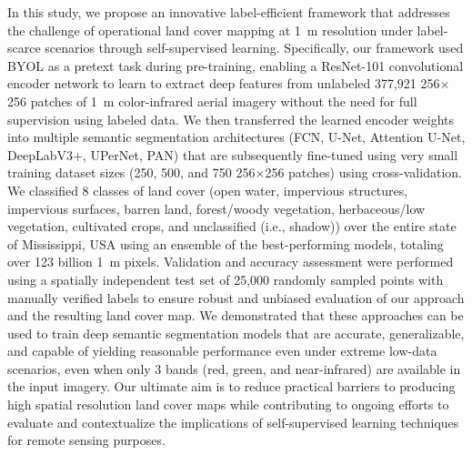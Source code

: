 In this study, we propose an innovative label-efficient framework that addresses the challenge of operational land cover mapping at \SI{1}{\meter} resolution under label-scarce scenarios through self-supervised learning.
Specifically, our framework used BYOL as a pretext task during pre-training, enabling a ResNet-101 convolutional encoder network to learn to extract deep features from unlabeled 377,921 256\(\times\)256 patches of \SI{1}{\meter} color-infrared aerial imagery without the need for full supervision using labeled data.
We then transferred the learned encoder weights into multiple semantic segmentation architectures (FCN, U-Net, Attention U-Net, DeepLabV3+, UPerNet, PAN) that are subsequently fine-tuned using very small training dataset sizes (250, 500, and 750 256\(\times\)256 patches) using cross-validation.
We classified 8 classes of land cover (open water, impervious structures, impervious surfaces, barren land, forest/woody vegetation, herbaceous/low vegetation, cultivated crops, and unclassified (i.e., shadow)) over the entire state of Mississippi, USA using an ensemble of the best-performing models, totaling over 123 billion \SI{1}{\meter} pixels.
Validation and accuracy assessment were performed using a spatially independent test set of 25,000 randomly sampled points with manually verified labels to ensure robust and unbiased evaluation of our approach and the resulting land cover map.
We demonstrated that these approaches can be used to train deep semantic segmentation models that are accurate, generalizable, and capable of yielding reasonable performance even under extreme low-data scenarios, even when only 3 bands (red, green, and near-infrared) are available in the input imagery.
Our ultimate aim is to reduce practical barriers to producing high spatial resolution land cover maps while contributing to ongoing efforts to evaluate and contextualize the implications of self-supervised learning techniques for remote sensing purposes.

